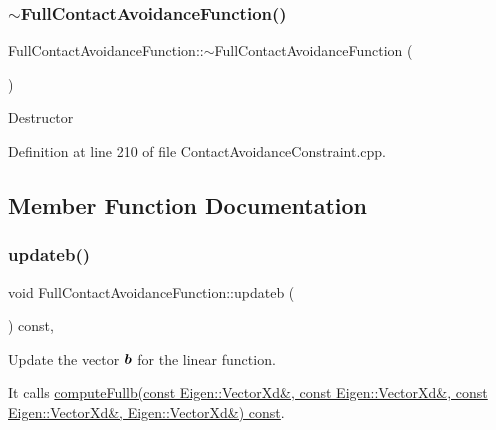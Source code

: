 \hypertarget{classocra_1_1FullContactAvoidanceFunction_abf414a050f3b16c4a095049937335c96}{}\label{classocra_1_1FullContactAvoidanceFunction_abf414a050f3b16c4a095049937335c96} 
\subsubsection{\texorpdfstring{$\sim$\+Full\+Contact\+Avoidance\+Function()}{~FullContactAvoidanceFunction()}}
{\footnotesize\ttfamily Full\+Contact\+Avoidance\+Function\+::$\sim$\+Full\+Contact\+Avoidance\+Function (\begin{DoxyParamCaption}{ }\end{DoxyParamCaption})}

Destructor 

Definition at line 210 of file Contact\+Avoidance\+Constraint.\+cpp.



\subsection{Member Function Documentation}
\hypertarget{classocra_1_1FullContactAvoidanceFunction_ae24690ecd464eefd43936907e33c4cb9}{}\label{classocra_1_1FullContactAvoidanceFunction_ae24690ecd464eefd43936907e33c4cb9} 
\subsubsection{\texorpdfstring{updateb()}{updateb()}}
{\footnotesize\ttfamily void Full\+Contact\+Avoidance\+Function\+::updateb (\begin{DoxyParamCaption}{ }\end{DoxyParamCaption}) const\hspace{0.3cm}{\ttfamily [protected]}, {\ttfamily [virtual]}}

Update the vector $ \mbox{\boldmath${b}$} $ for the linear function.

It calls \hyperlink{classocra_1_1ContactAvoidanceFunction_a9afd02871f0d26321b526290f565d541}{compute\+Fullb(const Eigen\+::\+Vector\+Xd\&, const Eigen\+::\+Vector\+Xd\&, const Eigen\+::\+Vector\+Xd\&, Eigen\+::\+Vector\+Xd\&) const}. 

